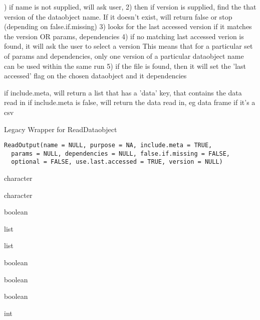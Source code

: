 \documentclass[a4paper]{book}
\begin{document}
%
\begin{Details}) if name is not supplied, will ask user,
2) then if version is supplied, find the that version of the dataobject name. If it doesn't exist, will return false or stop (depending on false.if.missing)
3) looks for the last accessed version if it matches the version OR  params, dependencies
4) if no matching last accessed verion is found, it will ask the user to select a version
This means that for a particular set of params and dependencies, only one version of a particular dataobject name can be used within the same run
5) if the file is found, then it will set the 'last accessed' flag
on the chosen dataobject and it dependencies
\end{Details}
%
\begin{Value}
if include.meta, will return a list that has a 'data' key, that contains the data read in if include.meta is false, will return the data read in, eg data frame if it's a csv
\end{Value}
%
\begin{Description}\relax
Legacy Wrapper for ReadDataobject
\end{Description}
%
\begin{Usage}
\begin{verbatim}
ReadOutput(name = NULL, purpose = NA, include.meta = TRUE,
  params = NULL, dependencies = NULL, false.if.missing = FALSE,
  optional = FALSE, use.last.accessed = TRUE, version = NULL)
\end{verbatim}
\end{Usage}
%
\begin{Arguments}
\begin{ldescription}
\item[\code{name}] character

\item[\code{purpose}] character

\item[\code{include.meta}] boolean

\item[\code{params}] list

\item[\code{dependencies}] list

\item[\code{false.if.missing}] boolean

\item[\code{optional}] boolean

\item[\code{use.last.accessed}] boolean

\item[\code{version}] int
\end{ldescription}
\end{Arguments}
\end{document}
